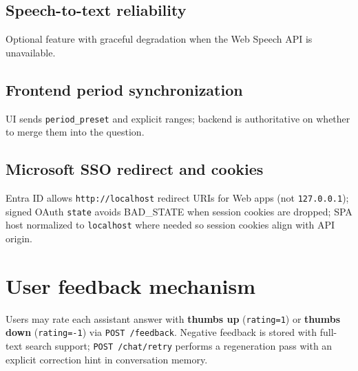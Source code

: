 \subsection{Speech-to-text reliability}
Optional feature with graceful degradation when the Web Speech API is unavailable.

\subsection{Frontend period synchronization}
UI sends \texttt{period\_preset} and explicit ranges; backend is authoritative on whether to merge them into the question.

\subsection{Microsoft SSO redirect and cookies}
Entra ID allows \texttt{http://localhost} redirect URIs for Web apps (not \texttt{127.0.0.1}); signed OAuth \texttt{state} avoids BAD\_STATE when session cookies are dropped; SPA host normalized to \texttt{localhost} where needed so session cookies align with API origin.

\section{User feedback mechanism}
Users may rate each assistant answer with \textbf{thumbs up} (\texttt{rating=1}) or \textbf{thumbs down} (\texttt{rating=-1}) via \texttt{POST /feedback}. Negative feedback is stored with full-text search support; \texttt{POST /chat/retry} performs a regeneration pass with an explicit correction hint in conversation memory.
